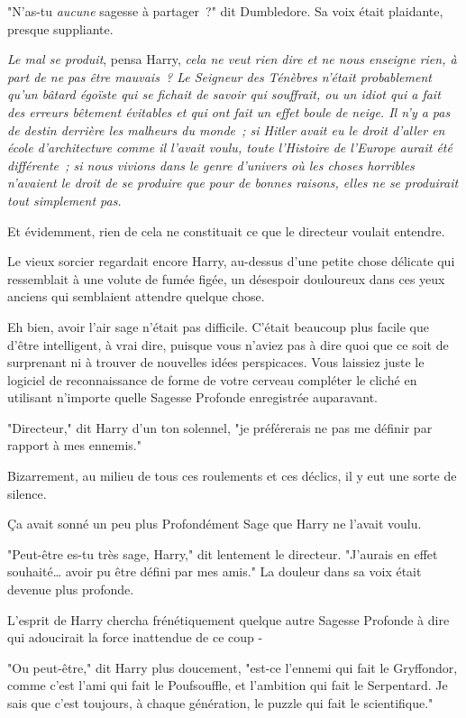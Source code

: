 "N'as-tu \emph{aucune} sagesse à partager~?" dit Dumbledore. Sa voix était plaidante, presque suppliante.

\emph{Le mal se produit}, pensa Harry, \emph{cela ne veut rien dire et ne nous enseigne rien, à part de ne pas être mauvais~? Le Seigneur des Ténèbres n'était probablement qu'un bâtard égoïste qui se fichait de savoir qui souffrait, ou un idiot qui a fait des erreurs bêtement évitables et qui ont fait un effet boule de neige. Il n'y a pas de destin derrière les malheurs du monde~; si Hitler avait eu le droit d'aller en école d'architecture comme il l'avait voulu, toute l'Histoire de l'Europe aurait été différente~; si nous vivions dans le genre d'univers où les choses horribles n'avaient le droit de se produire que pour de bonnes raisons, elles ne se produirait tout simplement pas.}

Et évidemment, rien de cela ne constituait ce que le directeur voulait entendre.

Le vieux sorcier regardait encore Harry, au-dessus d'une petite chose délicate qui ressemblait à une volute de fumée figée, un désespoir douloureux dans ces yeux anciens qui semblaient attendre quelque chose.

Eh bien, avoir l'air sage n'était pas difficile. C'était beaucoup plus facile que d'être intelligent, à vrai dire, puisque vous n'aviez pas à dire quoi que ce soit de surprenant ni à trouver de nouvelles idées perspicaces. Vous laissiez juste le logiciel de reconnaissance de forme de votre cerveau compléter le cliché en utilisant n'importe quelle Sagesse Profonde enregistrée auparavant.

"Directeur," dit Harry d'un ton solennel, "je préférerais ne pas me définir par rapport à mes ennemis."

Bizarrement, au milieu de tous ces roulements et ces déclics, il y eut une sorte de silence.

Ça avait sonné un peu plus Profondément Sage que Harry ne l'avait voulu.

"Peut-être es-tu très sage, Harry," dit lentement le directeur. "J'aurais en effet souhaité… avoir pu être défini par mes amis." La douleur dans sa voix était devenue plus profonde.

L'esprit de Harry chercha frénétiquement quelque autre Sagesse Profonde à dire qui adoucirait la force inattendue de ce coup -

"Ou peut-être," dit Harry plus doucement, "est-ce l'ennemi qui fait le Gryffondor, comme c'est l'ami qui fait le Poufsouffle, et l'ambition qui fait le Serpentard. Je sais que c'est toujours, à chaque génération, le puzzle qui fait le scientifique."

